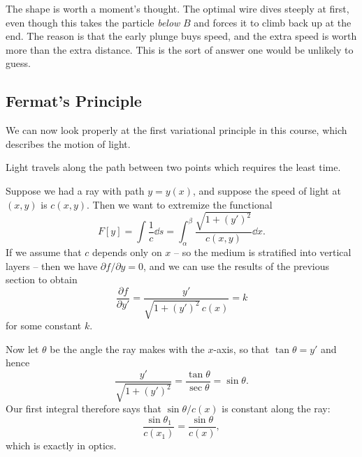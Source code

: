 \begin{example}
\begin{center}
	\end{center}

	The shape is worth a moment's thought. The optimal wire dives steeply at first, even though this takes the particle \emph{below} $B$ and forces it to climb back up at the end. The reason is that the early plunge buys speed, and the extra speed is worth more than the extra distance. This is the sort of answer one would be unlikely to guess.
\end{example}


\subsection{Fermat's Principle}\label{sec:fermat}

We can now look properly at the first variational principle in this course, which describes the motion of light.

\begin{law}
Light travels along the path between two points which requires the least time.
\end{law}

Suppose we had a ray with path $y = y(x)$, and suppose the speed of light at $(x, y)$ is $c(x, y)$. Then we want to extremize the functional
$$
F[y] = \int \frac{1}{c} \dd s = \int_{\alpha}^{\beta} \frac{\sqrt{1 + (y')^2}}{c(x, y)} \dd x.
$$
If we assume that $c$ depends only on $x$ -- so the medium is stratified into vertical layers -- then we have $\partial f /\partial y = 0$, and we can use the results of the previous section to obtain
$$
\frac{\partial f}{\partial y'} = \frac{y'}{\sqrt{1 + (y')^2}\, c(x)} = k
$$
for some constant $k$.

Now let $\theta$ be the angle the ray makes with the $x$-axis, so that $\tan\theta = y'$ and hence
$$
\frac{y'}{\sqrt{1 + (y')^2}} = \frac{\tan\theta}{\sec\theta} = \sin\theta.
$$
Our first integral therefore says that $\sin\theta / c(x)$ is constant along the ray:
$$
\frac{\sin \theta_1}{c(x_1)} = \frac{\sin \theta}{c(x)},
$$
which is exactly  in optics.

